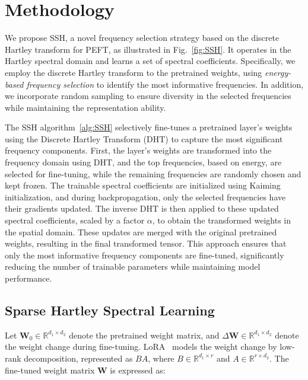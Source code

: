 \section{Methodology}

We propose SSH, a novel frequency selection strategy based on the discrete Hartley transform for PEFT, as illustrated in Fig.~\ref{fig:SSH}.  
It operates in the Hartley spectral domain and learns a set of spectral coefficients. 
Specifically, we employ the discrete Hartley transform to the pretrained weights, using \textit{energy-based frequency selection} to identify the most informative frequencies. In addition, we incorporate random sampling to ensure diversity in the selected frequencies while maintaining the representation ability.

The SSH algorithm~\ref{alg:SSH} selectively fine-tunes a pretrained layer's weights using the Discrete Hartley Transform (DHT) to capture the most significant frequency components. First, the layer's weights are transformed into the frequency domain using DHT, and the top frequencies, based on energy, are selected for fine-tuning, while the remaining frequencies are randomly chosen and kept frozen. The trainable spectral coefficients are initialized using Kaiming initialization, and during backpropagation, only the selected frequencies have their gradients updated. The inverse DHT is then applied to these updated spectral coefficients, scaled by a factor $\alpha$, to obtain the transformed weights in the spatial domain. These updates are merged with the original pretrained weights, resulting in the final transformed tensor. This approach ensures that only the most informative frequency components are fine-tuned, significantly reducing the number of trainable parameters while maintaining model performance.





\subsection{Sparse Hartley Spectral Learning}

Let $\mathbf{W}_0 \in \mathbb{R}^{d_1 \times d_2}$ denote the pretrained weight matrix, and $\Delta \mathbf{W} \in \mathbb{R}^{d_1 \times d_2}$ denote the weight change during fine-tuning. LoRA~\cite{hu2022lora,liu2024dora,gao2024parameter} models the weight change by low-rank decomposition, represented as $BA$, where $B \in \mathbb{R}^{d_1 \times r}$ and $A \in \mathbb{R}^{r \times d_2}$. The fine-tuned weight matrix $\mathbf{W}$ is expressed as:

